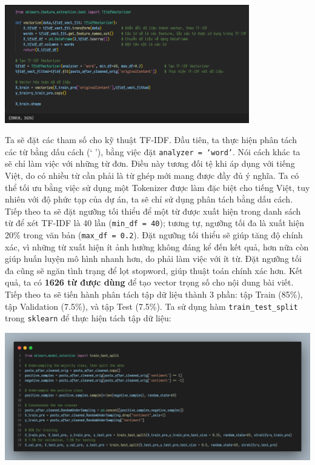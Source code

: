 \begin{center}
\includegraphics[width=0.8\textwidth]{images/code-5.8-tfidf.png}
\end{center}

Ta sẽ đặt các tham số cho kỹ thuật TF-IDF. Đầu tiên, ta thực hiện phân tách các từ bằng dấu cách (` '), bằng việc đặt \texttt{analyzer = `word'}. Nói cách khác ta sẽ chỉ làm việc với những từ đơn. Điều này tương đối tệ khi áp dụng với tiếng Việt, do có nhiều từ cần phải là từ ghép mới mang được đầy đủ ý nghĩa. Ta có thể tối ưu bằng việc sử dụng một Tokenizer được làm đặc biệt cho tiếng Việt, tuy nhiên với độ phức tạp của dự án, ta sẽ chỉ sử dụng phân tách bằng dấu cách.\\

Tiếp theo ta sẽ đặt ngưỡng tối thiểu để một từ được xuất hiện trong danh sách từ để xét TF-IDF là 40 lần (\texttt{min\_df = 40}); tương tự, ngưỡng tối đa là xuất hiện 20\% trong văn bản (\texttt{max\_df = 0.2}). Đặt ngưỡng tối thiểu sẽ giúp tăng độ chính xác, vì những từ xuất hiện ít ảnh hưởng không đáng kể đến kết quả, hơn nữa còn giúp huấn luyện mô hình nhanh hơn, do phải làm việc với ít từ. Đặt ngưỡng tối đa cũng sẽ ngăn tình trạng để lọt stopword, giúp thuật toán chính xác hơn. Kết quả, ta có \textbf{1626 từ được dùng} để tạo vector trọng số cho nội dung bài viết.\\

Tiếp theo ta sẽ tiến hành phân tách tập dữ liệu thành 3 phần: tập Train (85\%), tập Validation (7.5\%), và tập Test (7.5\%). Ta sử dụng hàm \texttt{train\_test\_split} trong \texttt{sklearn} để thực hiện tách tập dữ liệu:

\begin{center}
\includegraphics[width=1\textwidth]{images/code-5.9-splitdata.png}
\end{center}


